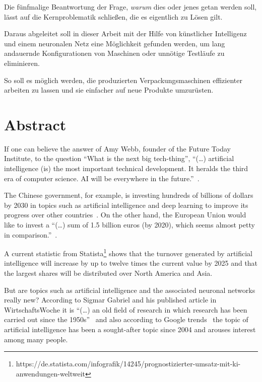 Die fünfmalige Beantwortung der Frage, \textit{warum} dies oder jenes getan werden soll, lässt auf die Kernproblematik
schließen, die es eigentlich zu Lösen gilt.

Daraus abgeleitet soll in dieser Arbeit mit der Hilfe von künstlicher Intelligenz und einem neuronalen Netz eine
Möglichkeit gefunden werden, um lang andauernde Konfigurationen von Maschinen oder unnötige Testläufe zu eliminieren.

So soll es möglich werden, die produzierten Verpackungsmaschinen effizienter arbeiten zu lassen und sie einfacher auf
neue Produkte umzurüsten.

\newpage

\section{Abstract}
\label{sec:abstract}
If one can believe the answer of Amy Webb, founder of the Future Today Institute, to the question \enquote{What is the
next big tech-thing}, \enquote{(\ldots) artificial intelligence (is) the most important technical development. It
heralds the third era of computer science. AI will be everywhere in the future.}~\cite{article_einleitung_dub_aw}.

The Chinese government, for example, is investing hundreds of billions of dollars by 2030 in topics such as artificial
intelligence and deep learning to improve its progress over other countries~\cite{article_einleitung_css}. On the other
hand, the European Union would like to invest a \enquote{(\ldots) sum of 1.5 billion euros (by 2020), which seems almost
petty in comparison.}~\cite{article_einleitung_ww_sg}.

A current statistic from
Statista\footnote{https://de.statista.com/infografik/14245/prognostizierter-umsatz-mit-ki-anwendungen-weltweit} shows
that the turnover generated by artificial intelligence will increase by up to twelve times the current value by 2025
and that the largest shares will be distributed over North America and Asia.

But are topics such as artificial intelligence and the associated neuronal networks really new? According to Sigmar
Gabriel and his published article in WirtschaftsWoche it is \enquote{(\ldots) an old field of research in which
research has been carried out since the 1950s}~\cite{article_einleitung_ww_sg} and also according to Google
trends~\cite{online_einleitung_googletrends} the topic of artificial intelligence has been a sought-after topic since
2004 and arouses interest among many people.


